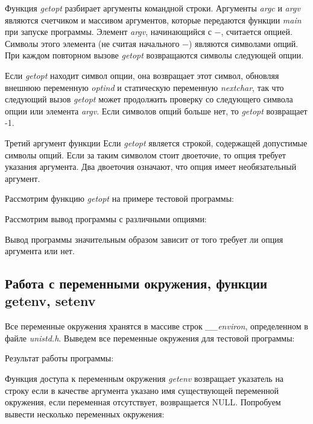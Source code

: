 \documentclass[14pt,a4paper,report]{report}
\begin{document}
Функция \emph{getopt} разбирает аргументы командной строки. Аргументы \emph{argc} и \emph{argv} являются счетчиком и массивом аргументов, которые передаются функции \emph{main} при запуске программы. Элемент \emph{argv}, начинающийся с $-$, считается опцией. Символы этого элемента (не считая начального $-$) являются символами опций. При каждом повторном вызове \emph{getopt} возвращаются символы следующей опции. 

Если \emph{getopt} находит символ опции, она возвращает этот символ, обновляя внешнюю переменную \emph{optind} и статическую переменную \emph{nextchar}, так что следующий вызов \emph{getopt} может продолжить проверку со следующего символа опции или элемента \emph{argv}. Если символов опций больше нет, то \emph{getopt} возвращает -1.

Третий аргумент функции Если \emph{getopt} является строкой, содержащей допустимые символы опций. Если за таким символом стоит двоеточие, то опция требует указания аргумента. Два двоеточия означают, что опция имеет необязательный аргумент.

Рассмотрим функцию \emph{getopt} на примере тестовой программы:



Рассмотрим вывод программы с различными опциями:



Вывод программы значительным образом зависит от того требует ли опция аргумента или нет.

\subsection{Работа с переменными окружения, функции getenv, setenv}

Все переменные окружения хранятся в массиве строк \emph{\_\_environ}, определенном в файле \emph{unistd.h}. Выведем все переменные окружения для тестовой программы:



Результат работы программы:



Функция доступа к переменным окружения \emph{getenv} возвращает указатель на строку если в качестве аргумента указано имя существующей переменной окружения, если переменная отсутствует, возвращается NULL. Попробуем вывести несколько переменных окружения:


\end{document}
